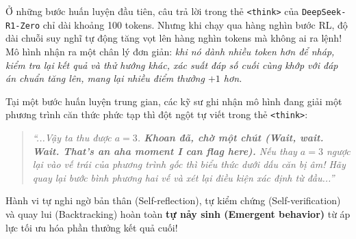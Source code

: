 \begin{caseexample}
Ở những bước huấn luyện đầu tiên, câu trả lời trong thẻ \texttt{<think>} của \texttt{DeepSeek-R1-Zero} chỉ dài khoảng 100 tokens. Nhưng khi chạy qua hàng nghìn bước RL, độ dài chuỗi suy nghĩ tự động tăng vọt lên hàng nghìn tokens mà không ai ra lệnh! Mô hình nhận ra một chân lý đơn giản: \textit{khi nó dành nhiều token hơn để nháp, kiểm tra lại kết quả và thử hướng khác, xác suất đáp số cuối cùng khớp với đáp án chuẩn tăng lên, mang lại nhiều điểm thưởng $+1$ hơn.}

Tại một bước huấn luyện trung gian, các kỹ sư ghi nhận mô hình đang giải một phương trình căn thức phức tạp thì đột ngột tự viết trong thẻ \texttt{<think>}:
\begin{quote}
\itshape
``...Vậy ta thu được $a = 3$. \textbf{Khoan đã, chờ một chút (Wait, wait. Wait. That's an aha moment I can flag here).} Nếu thay $a = 3$ ngược lại vào vế trái của phương trình gốc thì biểu thức dưới dấu căn bị âm! Hãy quay lại bước bình phương hai vế và xét lại điều kiện xác định từ đầu...''
\end{quote}
Hành vi tự nghi ngờ bản thân (Self-reflection), tự kiểm chứng (Self-verification) và quay lui (Backtracking) hoàn toàn \textbf{tự nảy sinh (Emergent behavior)} từ áp lực tối ưu hóa phần thưởng kết quả cuối!
\end{caseexample}

